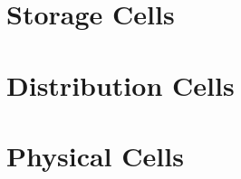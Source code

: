 
\chapter{Storage Cells}
\clearpage





\chapter{Distribution Cells}
\clearpage








\chapter{Physical Cells}
\clearpage









